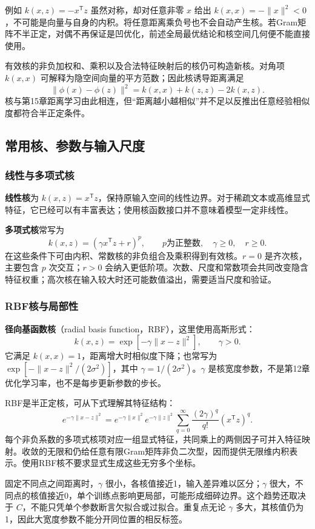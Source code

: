 \documentclass[UTF8,fontset=none,zihao=-4,a4paper]{ctexart}
\newcommand{\term}[1]{\textbf{#1}}
\numberwithin{equation}{section}
\numberwithin{figure}{section}
\begin{document}
例如 $k(x,z)=-x^{\mathsf T}z$ 虽然对称，却对任意非零 $x$ 给出 $k(x,x)=-\|x\|^2<0$，不可能是向量与自身的内积。将任意距离乘负号也不会自动产生核。若Gram矩阵不半正定，对偶不再保证是凹优化，前述全局最优结论和核空间几何便不能直接使用。

有效核的非负加权和、乘积以及合法特征映射后的核仍可构造新核。对角项 $k(x,x)$ 可解释为隐空间向量的平方范数；因此核诱导距离满足
\[
 \|\phi(x)-\phi(z)\|^2=k(x,x)+k(z,z)-2k(x,z).
\]
核与第15章距离学习由此相连，但“距离越小越相似”并不足以反推出任意经验相似度都符合半正定条件。

\subsection{常用核、参数与输入尺度}
\subsubsection{线性与多项式核}
\term{线性核}为 $k(x,z)=x^{\mathsf T}z$，保持原输入空间的线性边界。对于稀疏文本或高维显式特征，它已经可以有丰富表达；使用核函数接口并不意味着模型一定非线性。

\term{多项式核}常写为
\[
 k(x,z)=(\gamma x^{\mathsf T}z+r)^p,
 \qquad p\text{为正整数},\quad\gamma\ge0,\quad r\ge0.
\]
在这些条件下可由内积、常数核的非负组合及乘积得到有效核。$r=0$ 是齐次核，主要包含 $p$ 次交互；$r>0$ 会纳入更低阶项。次数、尺度和常数项会共同改变隐含特征权重；高次核在输入较大时还可能数值溢出，需要适当尺度和验证。

\subsubsection{RBF核与局部性}
\term{径向基函数核}（radial basis function，RBF），这里使用高斯形式：
\begin{equation}\label{eq:svm-rbf}
 k(x,z)=\exp[-\gamma\|x-z\|^2],\qquad\gamma>0.
\end{equation}
它满足 $k(x,x)=1$，距离增大时相似度下降；也常写为 $\exp[-\|x-z\|^2/(2\sigma^2)]$，其中 $\gamma=1/(2\sigma^2)$。$\gamma$ 是核宽度参数，不是第12章优化学习率，也不是每步更新参数的步长。

RBF是半正定核，可从下式理解其特征结构：
\[
 e^{-\gamma\|x-z\|^2}
 =e^{-\gamma\|x\|^2}e^{-\gamma\|z\|^2}
   \sum_{q=0}^{\infty}\frac{(2\gamma)^q}{q!}(x^{\mathsf T}z)^q.
\]
每个非负系数的多项式核项对应一组显式特征，共同乘上的两侧因子可并入特征映射。收敛的无限和仍给任意有限Gram矩阵非负二次型，因而提供无限维内积表示。使用RBF核不要求显式生成这些无穷多个坐标。

固定不同点之间距离时，$\gamma$ 很小，各核值接近1，输入差异难以区分；$\gamma$ 很大，不同点的核值接近0，单个训练点影响更局部，可能形成细碎边界。这个趋势还取决于 $C$，不能只凭单个参数断言欠拟合或过拟合。重复点无论 $\gamma$ 多大，其核值仍为1，因此大宽度参数不能分开同位置的相反标签。
\end{document}
